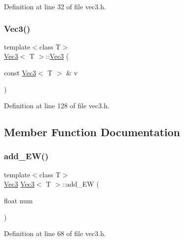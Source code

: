 Definition at line 32 of file vec3.\+h.

\mbox{\label{class_vec3_aea7744cd6c8f225b4cd6205b11ca5b46}} 
\subsubsection{\texorpdfstring{Vec3()}{Vec3()}\hspace{0.1cm}{\footnotesize\ttfamily [4/4]}}
{\footnotesize\ttfamily template$<$class T$>$ \\
\mbox{\hyperlink{class_vec3}{Vec3}}$<$ T $>$\+::\mbox{\hyperlink{class_vec3}{Vec3}} (\begin{DoxyParamCaption}\item[{const \mbox{\hyperlink{class_vec3}{Vec3}}$<$ T $>$ \&}]{v }\end{DoxyParamCaption})\hspace{0.3cm}{\ttfamily [inline]}}



Definition at line 128 of file vec3.\+h.



\subsection{Member Function Documentation}
\mbox{\label{class_vec3_ad31cbfb14b0da511f6692d5f0cb24808}} 
\subsubsection{\texorpdfstring{add\_EW()}{add\_EW()}\hspace{0.1cm}{\footnotesize\ttfamily [1/2]}}
{\footnotesize\ttfamily template$<$class T$>$ \\
\mbox{\hyperlink{class_vec3}{Vec3}} \mbox{\hyperlink{class_vec3}{Vec3}}$<$ T $>$\+::add\+\_\+\+EW (\begin{DoxyParamCaption}\item[{float}]{num }\end{DoxyParamCaption})\hspace{0.3cm}{\ttfamily [inline]}}



Definition at line 68 of file vec3.\+h.


